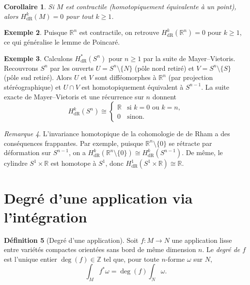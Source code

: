 \documentclass[12pt,a4paper,openany]{book}
\theoremstyle{definition}
\newtheorem{definition}{Définition}[chapter]
\newtheorem{exemple}[definition]{Exemple}
\theoremstyle{plain}
\newtheorem{corollaire}[definition]{Corollaire}
\theoremstyle{remark}
\newtheorem{remarque}[definition]{Remarque}
\newcommand{\Z}{\mathbb{Z}}
\newcommand{\R}{\mathbb{R}}
\begin{document}
\begin{corollaire}\label{cor:contractile-cohomologie}
Si $M$ est contractile (homotopiquement équivalente à un point), alors
$H^k_{\mathrm{dR}}(M) = 0$ pour tout $k \geq 1$.
\end{corollaire}

\begin{exemple}\label{ex:cohomologie-Rn}
Puisque $\R^n$ est contractile, on retrouve $H^k_{\mathrm{dR}}(\R^n) = 0$
pour $k \geq 1$, ce qui généralise le lemme de Poincaré.
\end{exemple}

\begin{exemple}\label{ex:cohomologie-Sn}
Calculons $H^*_{\mathrm{dR}}(S^n)$ pour $n \geq 1$ par la suite de
Mayer--Vietoris. Recouvrons $S^n$ par les ouverts
$U = S^n \setminus \{N\}$ (pôle nord retiré) et $V = S^n \setminus \{S\}$
(pôle sud retiré). Alors $U$ et $V$ sont difféomorphes à $\R^n$ (par
projection stéréographique) et $U \cap V$ est homotopiquement équivalent
à $S^{n-1}$. La suite exacte de Mayer--Vietoris et une récurrence sur $n$
donnent
\[
  H^k_{\mathrm{dR}}(S^n) \cong
  \begin{cases}
    \R & \text{si } k = 0 \text{ ou } k = n, \\
    0 & \text{sinon.}
  \end{cases}
\]
\end{exemple}

\begin{remarque}\label{rem:equivalence-homotopie-applications}
L'invariance homotopique de la cohomologie de de Rham a des conséquences
frappantes. Par exemple, puisque $\R^n \setminus \{0\}$ se rétracte par
déformation sur $S^{n-1}$, on a
$H^k_{\mathrm{dR}}(\R^n \setminus \{0\}) \cong H^k_{\mathrm{dR}}(S^{n-1})$.
De même, le cylindre $S^1 \times \R$ est homotope à $S^1$, donc
$H^1_{\mathrm{dR}}(S^1 \times \R) \cong \R$.
\end{remarque}

\section{Degré d'une application via l'intégration}\label{sec:degre}

\begin{definition}[Degré d'une application]\label{def:degre-integration}
Soit $f \colon M \to N$ une application lisse entre variétés compactes
orientées sans bord de même dimension $n$. Le \emph{degré de $f$} est
l'unique entier $\deg(f) \in \Z$ tel que, pour toute $n$-forme $\omega$
sur $N$,
\[
  \int_M f^*\omega = \deg(f) \int_N \omega.
\]
\end{definition}
\end{document}
